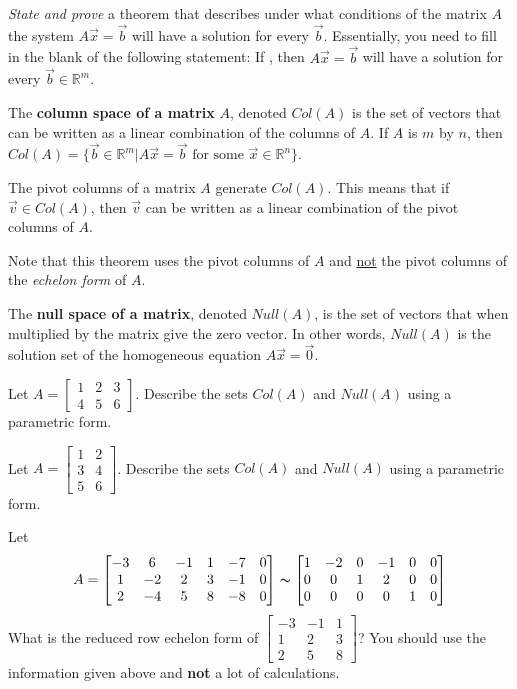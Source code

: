 \bq \emph{State and prove} a theorem that describes under what conditions of the matrix $A$ the system $A\vec{x}=\vec{b}$ will have a solution for every $\vec{b}$. Essentially, you need to fill in the blank of the following statement: If \underline{\hspace{2.5in}}, then $A\vec{x}=\vec{b}$ will have a solution for every $\vec{b} \in \mathbb{R}^m$.
\eq

\begin{definition} The \textbf{column space of a matrix} $A$, denoted $Col(A)$ is the set of vectors that can be written as a linear combination of the columns of $A$. If $A$ is $m$ by $n$, then $Col(A)=\{\vec{b} \in \mathbb{R}^m | A\vec{x} =\vec{b} \mbox{ for some } \vec{x} \in \mathbb{R}^n \}$.
\end{definition}

\begin{theorem} The pivot columns of a matrix $A$ generate $Col(A)$. This means that if $\vec{v} \in Col(A)$, then $\vec{v}$ can be written as a linear combination of the pivot columns of $A$.
\end{theorem}
Note that this theorem uses the pivot columns of $A$ and \underline{not} the pivot columns of the \emph{echelon form} of $A$.


\begin{definition} The \textbf{null space of a matrix}, denoted $Null(A)$, is the set of vectors that when multiplied by the matrix give the zero vector. In other words, $Null(A)$ is the solution set of the homogeneous equation $A\vec{x}=\vec{0}$.
\end{definition}

\bq Let $A=\begin{bmatrix} 1&2&3 \\4&5&6 \end{bmatrix}$. Describe the sets $Col(A)$ and $Null(A)$ using a parametric form.
\eq

\bq Let $A=\begin{bmatrix} 1&2\\ 3&4\\5&6 \end{bmatrix}$. Describe the sets $Col(A)$ and $Null(A)$ using a parametric form.
\eq

\bq Let $$A=\begin{bmatrix} -3&6&-1&1&-7&0 \\1&-2&2&3&-1&0 \\2&-4&5&8&-8&0 \end{bmatrix}  \thicksim \begin{bmatrix} 1&-2&0&-1&0&0\\0&0&1&2&0&0 \\ 0&0&0&0&1&0 \end{bmatrix}$$
What is the reduced row echelon form of $\begin{bmatrix} -3&-1&1 \\1&2&3 \\2&5&8\end{bmatrix}$? You should use the information given above and \textbf{not} a lot of calculations.
\eq

